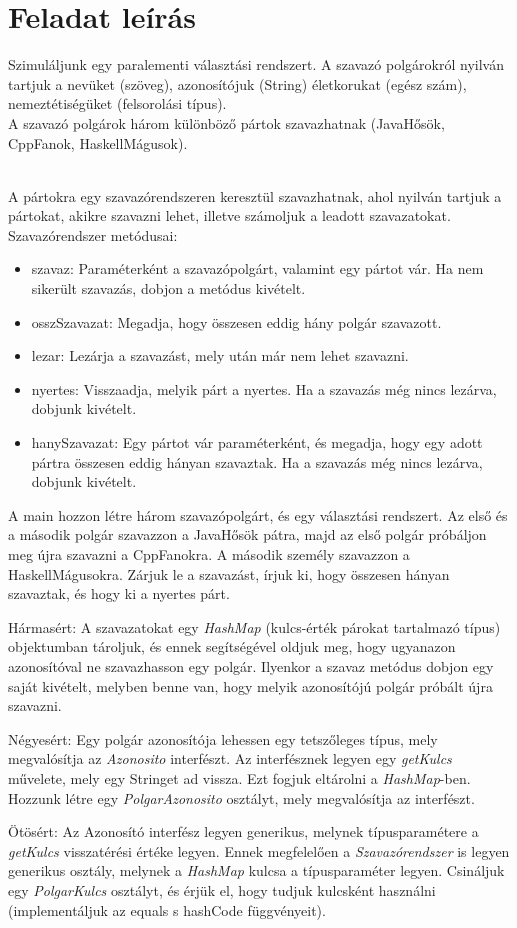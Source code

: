 \documentclass[12pt,a4paper]{article}
\begin{document}
\section{Feladat leírás}

Szimuláljunk egy paralementi választási rendszert. A szavazó polgárokról nyilván tartjuk a nevüket (szöveg), azonosítójuk (String) életkorukat (egész szám), nemeztétiségüket (felsorolási típus). \\ A szavazó polgárok három különböző pártok szavazhatnak (JavaHősök, CppFanok, HaskellMágusok). 

\\ A pártokra egy szavazórendszeren keresztül szavazhatnak, ahol nyilván tartjuk a pártokat, akikre szavazni lehet, illetve számoljuk a leadott szavazatokat. 
Szavazórendszer metódusai:
\begin{itemize}
\item szavaz: Paraméterként a szavazópolgárt, valamint egy pártot vár. Ha nem sikerült szavazás, dobjon a metódus kivételt.
\item osszSzavazat: Megadja, hogy összesen eddig hány polgár szavazott.
\item lezar: Lezárja a szavazást, mely után már nem lehet szavazni.
\item nyertes: Visszaadja, melyik párt a nyertes. Ha a szavazás még nincs lezárva, dobjunk kivételt.
\item hanySzavazat: Egy pártot vár paraméterként, és megadja, hogy egy adott pártra összesen eddig hányan szavaztak. Ha a szavazás még nincs lezárva, dobjunk kivételt.
\end{itemize}

A main hozzon létre három szavazópolgárt, és egy választási rendszert. Az első és a második polgár szavazzon a JavaHősök pátra, majd az első polgár próbáljon meg újra szavazni a CppFanokra. A második személy szavazzon a HaskellMágusokra. Zárjuk le a szavazást, írjuk ki, hogy összesen hányan szavaztak, és hogy ki a nyertes párt.

Hármasért: A szavazatokat egy \textit{HashMap} (kulcs-érték párokat tartalmazó típus) objektumban tároljuk, és ennek segítségével oldjuk meg, hogy ugyanazon azonosítóval ne szavazhasson egy polgár. Ilyenkor a szavaz metódus dobjon egy saját kivételt, melyben benne van, hogy melyik azonosítójú polgár próbált újra szavazni.

Négyesért: Egy polgár azonosítója lehessen egy tetszőleges típus, mely megvalósítja az \textit{Azonosito} interfészt. Az interfésznek legyen egy \textit{getKulcs} művelete, mely egy Stringet ad vissza. Ezt fogjuk eltárolni a \textit{HashMap}-ben. Hozzunk létre egy \textit{PolgarAzonosito} osztályt, mely megvalósítja az interfészt.

Ötösért: Az Azonosító interfész legyen generikus, melynek típusparamétere a \textit{getKulcs} visszatérési értéke legyen. Ennek megfelelően a \textit{Szavazórendszer} is legyen generikus osztály, melynek a \textit{HashMap} kulcsa a típusparaméter legyen. Csináljuk egy \textit{PolgarKulcs} osztályt, és érjük el, hogy tudjuk kulcsként használni (implementáljuk az equals s hashCode függvényeit).   
\end{document}
